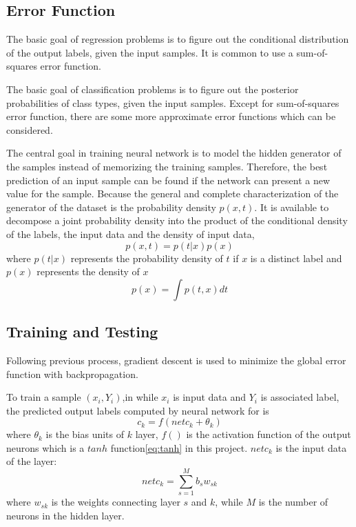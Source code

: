 \subsection{Error Function}

The basic goal of regression problems is to figure out the conditional distribution of the output labels, given the input samples. It is common to use a sum-of-squares error function.

The basic goal of classification problems is to figure out the posterior probabilities of class types, given the input samples. Except for sum-of-squares error function, there are some more approximate error functions which can be considered.

The central goal in training neural network is to model the hidden generator of the samples instead of memorizing the training samples. Therefore, the best prediction of an input sample can be found if the network can present a new value for the sample. Because the general and complete characterization of the generator of the dataset is the probability density $p(x,t)$. It is available to decompose a joint probability density into the product of the conditional density of the labels, the input data and the density of input data,
\begin{equation}\label{eq:JointProbDensity}
p(x,t) = p(t|x)p(x)
\end{equation}
where $p(t|x)$ represents the probability density of $t$ if $x$ is a distinct label and $p(x)$ represents the density of $x$
\begin{equation}\label{eq:ProbDensityX}
p(x) = \int p(t,x)dt
\end{equation}

\subsection{Training and Testing}

Following previous process, gradient descent is used to minimize the global error function with backpropagation. 

To train a sample $(x_{i}, Y_{i})$,in while $x_{i}$ is input data and $Y_{i}$ is associated label, the predicted output labels computed by neural network for is
\begin{equation}\label{eq:MultiLabelActivation}
c_{k} = f(netc_{k} + \theta_{k})
\end{equation}
where $\theta_{k}$ is the bias units of $k$ layer, $f()$ is the activation function of the output neurons which is a $tanh$ function\ref{eq:tanh} in this project. $netc_{k}$ is the input data of the layer:
\begin{equation}\label{eq:MultiLabel}
netc_{k} = \sum_{s=1}^M b_{s}w_{sk}
\end{equation}
where $w_{sk}$ is the weights connecting layer $s$ and $k$, while $M$ is the number of neurons in the hidden layer.

